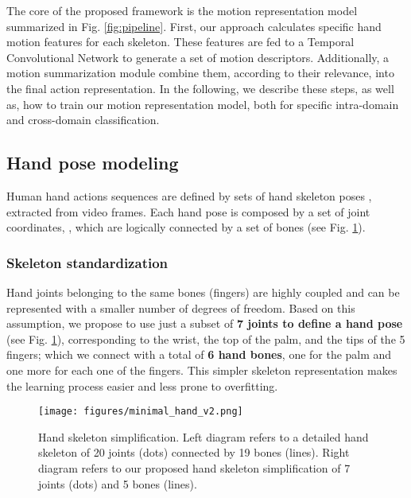 \documentclass[letterpaper, 10 pt, conference]{ieeeconf}
\begin{document}
The core of the proposed framework is the motion representation model summarized in Fig. \ref{fig:pipeline}. 
First, our approach calculates specific hand motion features for each skeleton. These features are fed to a Temporal Convolutional Network to generate a set of motion descriptors.
Additionally, a motion summarization module combine them, according to their relevance, into the final action representation.
In the following, we describe these steps, as well as, how to train our motion representation model, both for specific intra-domain and cross-domain classification. 



\subsection{Hand pose modeling}\label{sec:hand_modeling}



Human hand actions sequences are defined by sets of  hand skeleton poses , extracted from video frames. 
Each hand pose  is composed by a set of  joint coordinates, ,
which are logically connected by a set of  bones 
(see Fig. \ref{fig:min_hand}).



\subsubsection{Skeleton standardization}
Hand joints belonging to the same bones (fingers) are highly coupled and can be represented with a smaller number of degrees of freedom.
Based on this assumption, we propose to use just a subset of \textbf{7 joints to define a hand pose} (see Fig. \ref{fig:min_hand}), corresponding to the wrist, the top of the palm, and the tips of the 5 fingers; which we connect with a total of \textbf{6 hand bones}, one for the palm and one more for each one of the fingers. 
This simpler skeleton representation makes the learning process easier and less prone to overfitting.


\begin{figure}
    \centering
    \texttt{[image: figures/minimal\_hand\_v2.png]}
    \caption{Hand skeleton simplification. Left diagram refers to a detailed hand skeleton of 20 joints (dots) connected by 19 bones (lines). Right diagram refers to our proposed hand skeleton simplification of 7 joints (dots) and 5 bones (lines).
    }
    \label{fig:min_hand}
\end{figure}
\end{document}
